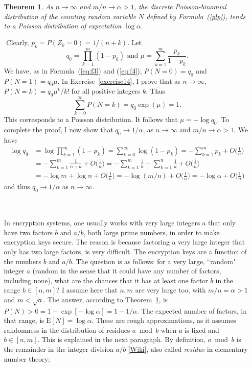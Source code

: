 \documentclass[10pt]{article}
\newtheorem{theorem}{Theorem}[section]
\newenvironment{proof}[1][Proof]{\begin{trivlist}
\item[\hskip \labelsep {\bfseries #1}]}{\end{trivlist}}
\newcommand{\qed}{\nobreak \ifvmode \relax \else
      \ifdim\lastskip<1.5em \hskip-\lastskip
      \hskip1.5em plus0em minus0.5em \fi \nobreak
      \vrule height0.75em width0.5em depth0.25em\fi}
\begin{document}
\begin{theorem}\label{prop1}
As $n\rightarrow\infty$ and $m/n\rightarrow\alpha>1$, the discrete Poisson-binomial distribution of the counting random variable $N$ defined by Formula~(\ref{plp}), tends to a Poisson distribution of expectation $\log\alpha$.
\end{theorem}
\begin{proof}
$ $ \newline 
Clearly, $p_k=P(Z_k=0)=1/(n+k)$. Let $$q_0 = \prod_{k=1}^m (1-p_k) \mbox{ and } \mu=\sum_{k=1}^m \frac{p_k}{1-p_k}.$$
We have, as in Formula~(\ref{eq:f3}) and (\ref{eq:f4}), $P(N=0)=q_0$ and $P(N=1)=q_0 \mu$. In Exercise~\ref{exercise14}, I prove that as $n\rightarrow\infty$, 
$P(N=k)=q_0 \mu^k/k!$ for all positive integers $k$.  Thus
$$\sum_{k=0}^\infty P(N=k) = q_0\exp(\mu)=1.$$
This corresponds to a Poisson distribution. It follows that $\mu=-\log q_0$. To complete the proof, I now show that $q_0\rightarrow 1/\alpha$, as $n\rightarrow\infty$
 and $m/n\rightarrow \alpha > 1$. 
We have 
\begin{align}
\log q_0 & = \log \prod_{k=1}^m (1-p_k)  =\sum_{k=0}^\infty \log(1-p_k)  =-\sum_{k=1}^m  p_k +O\Big(\frac{1}{n}\Big)\nonumber\\
& = -\sum_{k=1}^m  \frac{1}{n+k} +O\Big(\frac{1}{n}\Big)  =  -\sum_{k=1}^m  \frac{1}{k} +\sum_{k=1}^{n}  \frac{1}{k}+O\Big(\frac{1}{n}\Big)\nonumber\\
& = -\log m + \log n +O\Big(\frac{1}{n}\Big) = -\log(m/n) + O\Big(\frac{1}{n}\Big)  = -\log\alpha + O\Big(\frac{1}{n}\Big)\nonumber
\end{align}
and thus $q_0 \rightarrow 1/\alpha$ as $n\rightarrow\infty$. \qed
\end{proof}
\quad \\
 \nopagebreak \vspace{1ex} \\
In encryption systems, one usually works with very large integers $a$ that only have two factors $b$ and $a/b$, both large prime numbers, in order to make encryption keys secure. The reason is because factoring a very large integer that only has two large factors, is very difficult. The encryption keys are a function of the numbers $b$ and $a/b$. The question is as follows: for a very large, ``random" integer $a$ (random in the sense that it could have any number of factors, including none), what are the chances that it has at least one factor $b$ in the range $b\in[n, m]$? I assume here that $n,m$ are very large too, with $m/n=\alpha>1$ and $m<\sqrt{a}$. The answer, according to Theorem~\ref{prop1}, is $P(N)>0=1-\exp[-\log \alpha]=1-1/\alpha$. The expected number of factors, in that range, is $\mbox{E}[N] = \log\alpha$. These are rough approximations, as it assumes randomness in the distribution of residues $a \bmod{b}$ when $a$ is fixed and $b\in[n,m]$. This is explained in the next paragraph. By definition, $a \bmod{b}$ is the remainder in the integer division $a/b$ [\href{https://en.wikipedia.org/wiki/Euclidean_division}{Wiki}], also called {\em residue} in elementary number theory;
\end{document}
